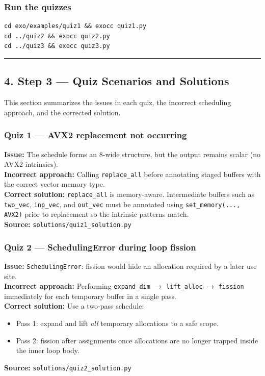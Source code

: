 \subsubsection{Run the quizzes}
\begin{verbatim}
cd exo/examples/quiz1 && exocc quiz1.py
cd ../quiz2 && exocc quiz2.py
cd ../quiz3 && exocc quiz3.py
\end{verbatim}

\begin{center}\rule{0.5\linewidth}{0.5pt}\end{center}

\hypertarget{step-3-quiz-scenarios-and-solutions}{%
\subsection{4. Step 3 --- Quiz Scenarios and Solutions}\label{step-3-quiz-scenarios-and-solutions}}

This section summarizes the issues in each quiz, the incorrect scheduling approach, and the corrected solution.

\subsubsection{Quiz 1 --- AVX2 replacement not occurring}

\textbf{Issue:} The schedule forms an 8-wide structure, but the output remains scalar (no AVX2 intrinsics).\\
\textbf{Incorrect approach:} Calling \texttt{replace\_all} before annotating staged buffers with the correct vector memory type.\\
\textbf{Correct solution:} \texttt{replace\_all} is memory-aware. Intermediate buffers such as \texttt{two\_vec}, \texttt{inp\_vec}, and \texttt{out\_vec} must be annotated using \texttt{set\_memory(..., AVX2)} prior to replacement so the intrinsic patterns match.\\
\textbf{Source:} \texttt{solutions/quiz1\_solution.py}

\subsubsection{Quiz 2 --- SchedulingError during loop fission}

\textbf{Issue:} \texttt{SchedulingError}: fission would hide an allocation required by a later use site.\\
\textbf{Incorrect approach:} Performing \texttt{expand\_dim} $\rightarrow$ \texttt{lift\_alloc} $\rightarrow$ \texttt{fission} immediately for each temporary buffer in a single pass.\\
\textbf{Correct solution:} Use a two-pass schedule:
\begin{itemize}
  \item Pass 1: expand and lift \emph{all} temporary allocations to a safe scope.
  \item Pass 2: fission after assignments once allocations are no longer trapped inside the inner loop body.
\end{itemize}
\textbf{Source:} \texttt{solutions/quiz2\_solution.py}

